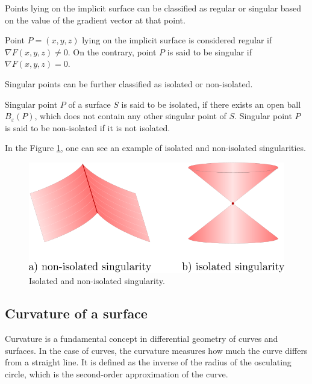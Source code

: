 Points lying on the implicit surface can be classified as regular or
singular based on the value of the gradient vector at that point.

\begin{definition}
    Point $P=(x,y,z)$ lying on the implicit surface is considered regular
    if $\nabla F(x, y, z) \neq 0$. On the contrary, point $P$ is said to be 
    singular if $\nabla F(x, y, z) = 0$.
\end{definition}

Singular points can be further classified as isolated or non-isolated.

\begin{definition}
    Singular point $P$ of a surface $S$ is said to be isolated,
    if there exists an open ball $B_\varepsilon(P)$, which does not 
    contain any other singular point of $S$.
    Singular point $P$ is said to be non-isolated if it is not isolated.
\end{definition}

In the Figure \ref{img:2}, one can see an example of isolated and non-isolated
singularities.

\begin{figure}
    \centerline{\includegraphics[scale=0.5]{images/img2}}
    \caption[Isolated and non-isolated singularity]
    {Isolated and non-isolated singularity.}
    \label{img:2}
\end{figure}

\subsection{Curvature of a surface}

Curvature is a fundamental concept in differential geometry of curves and surfaces.
In the case of curves, the curvature measures how much the curve differs from a 
straight line. It is defined as the inverse of the radius of the osculating circle,
which is the second-order approximation of the curve.

